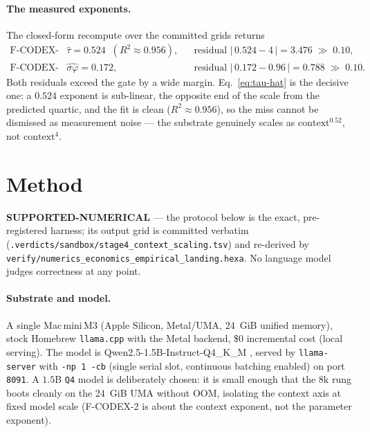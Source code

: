 \documentclass[11pt,a4paper]{article}
\newcommand{\green}[1]{\textcolor{green!50!black}{\textbf{#1}}}
\newcommand{\taum}{\ensuremath{\hat{\tau}}}
\begin{document}
\paragraph{The measured exponents.}
The closed-form recompute over the committed grids returns
\begin{align}
\label{eq:tau-hat}
\text{F-CODEX-2:}\quad & \taum = 0.524 \;\; (R^2 \approx 0.956),
  && \text{residual } |\,0.524 - 4\,| = 3.476 \;\gg\; 0.10, \\
\label{eq:sigma-hat}
\text{F-CODEX-1:}\quad & \hat{\sigma\varphi} = 0.172,
  && \text{residual } |\,0.172 - 0.96\,| = 0.788 \;\gg\; 0.10 .
\end{align}
Both residuals exceed the gate by a wide margin. Eq.~\eqref{eq:tau-hat} is the
decisive one: a \(0.524\) exponent is sub-linear, the opposite end of the scale
from the predicted quartic, and the fit is clean (\(R^2 \approx 0.956\)), so the
miss cannot be dismissed as measurement noise --- the substrate genuinely scales
as \(\mathrm{context}^{0.52}\), not \(\mathrm{context}^{4}\).

\section{Method}
\label{sec:method}
\green{SUPPORTED-NUMERICAL} --- the protocol below is the exact, pre-registered
harness; its output grid is committed verbatim
(\texttt{.verdicts/sandbox/stage4\_context\_scaling.tsv}) and re-derived by
\texttt{verify/numerics\_economics\_empirical\_landing.hexa}. No language model
judges correctness at any point.

\paragraph{Substrate and model.}
A single Mac\,mini\,M3 (Apple Silicon, Metal/UMA, \SI{24}{GiB} unified memory),
stock Homebrew \texttt{llama.cpp} \citep{llamacpp} with the Metal backend, \$0
incremental cost (local serving). The model is
Qwen2.5-1.5B-Instruct-Q4\_K\_M \citep{qwen25}, served by \texttt{llama-server}
with \texttt{-np 1 -cb} (single serial slot, continuous batching enabled) on
port \texttt{8091}. A \(1.5\)B \texttt{Q4} model is deliberately chosen: it is
small enough that the \(8\)k rung boots cleanly on the \SI{24}{GiB} UMA without
OOM, isolating the context axis at fixed model scale (F-CODEX-2 is about the
context exponent, not the parameter exponent).
\end{document}
